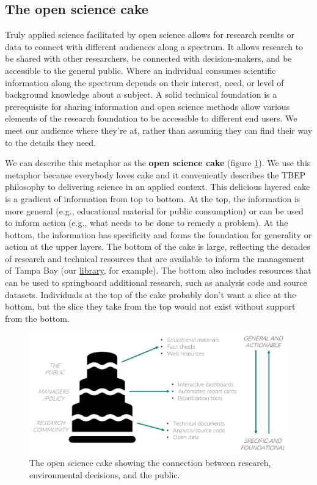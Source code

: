 \documentclass[
]{book}
\begin{document}
\hypertarget{the-open-science-cake}{%
\subsection{The open science cake}\label{the-open-science-cake}}

Truly applied science facilitated by open science allows for research results or data to connect with different audiences along a spectrum. It allows research to be shared with other researchers, be connected with decision-makers, and be accessible to the general public. Where an individual consumes scientific information along the spectrum depends on their interest, need, or level of background knowledge about a subject. A solid technical foundation is a prerequisite for sharing information and open science methods allow various elements of the research foundation to be accessible to different end users. We meet our audience where they're at, rather than assuming they can find their way to the details they need.

We can describe this metaphor as the \textbf{open science cake} (figure \ref{fig:cake}). We use this metaphor because everybody loves cake and it conveniently describes the TBEP philosophy to delivering science in an applied context. This delicious layered cake is a gradient of information from top to bottom. At the top, the information is more general (e.g., educational material for public consumption) or can be used to inform action (e.g., what needs to be done to remedy a problem). At the bottom, the information has specificity and forms the foundation for generality or action at the upper layers. The bottom of the cake is large, reflecting the decades of research and technical resources that are available to inform the management of Tampa Bay (our \href{http://tbep.org/library}{library}, for example). The bottom also includes resources that can be used to springboard additional research, such as analysis code and source datasets. Individuals at the top of the cake probably don't want a slice at the bottom, but the slice they take from the top would not exist without support from the bottom.

\begin{figure}

{\centering \includegraphics[width=1\linewidth]{img/cake} 

}

\caption{The open science cake showing the connection between research, environmental decisions, and the public.}\label{fig:cake}
\end{figure}
\end{document}
